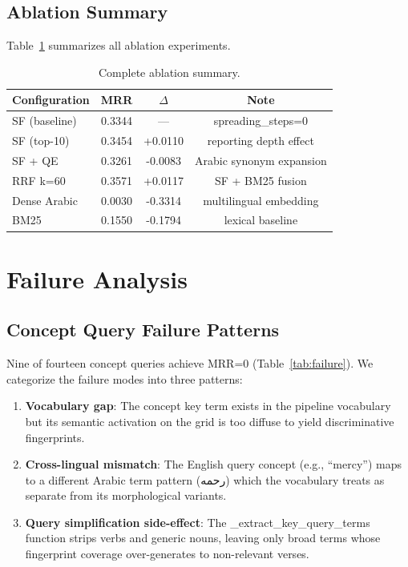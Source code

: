 \documentclass[conference]{IEEEtran}
\begin{document}
\subsection{Ablation Summary}

Table~\ref{tab:ablation_summary} summarizes all ablation experiments.

\begin{table}[t]
  \centering
  \caption{Complete ablation summary.}
  \label{tab:ablation_summary}
  \footnotesize
  \begin{tabular}{lccc}
    \toprule
    \textbf{Configuration} & \textbf{MRR} & $\Delta$ &
    \textbf{Note} \\
    \midrule
    SF (baseline) & 0.3344 & --- & spreading\_steps=0 \\
    SF (top-10) & 0.3454 & +0.0110 & reporting depth effect \\
    SF + QE & 0.3261 & -0.0083 & Arabic synonym expansion \\
    RRF k=60 & 0.3571 & +0.0117 & SF + BM25 fusion \\
    Dense Arabic & 0.0030 & -0.3314 & multilingual embedding \\
    BM25 & 0.1550 & -0.1794 & lexical baseline \\
    \bottomrule
  \end{tabular}
\end{table}

\section{Failure Analysis}

\subsection{Concept Query Failure Patterns}

Nine of fourteen concept queries achieve MRR=0 (Table~\ref{tab:failure}).
We categorize the failure modes into three patterns:

\begin{enumerate}
  \item \textbf{Vocabulary gap}: The concept key term exists in the
        pipeline vocabulary but its semantic activation on the grid is
        too diffuse to yield discriminative fingerprints.
  \item \textbf{Cross-lingual mismatch}: The English query concept
        (e.g., ``mercy'') maps to a different Arabic term pattern
        (رحمه) which the vocabulary treats as separate from its
        morphological variants.
  \item \textbf{Query simplification side-effect}: The
        \_extract\_key\_query\_terms function strips verbs and generic
        nouns, leaving only broad terms whose fingerprint coverage
        over-generates to non-relevant verses.
\end{enumerate}
\end{document}
